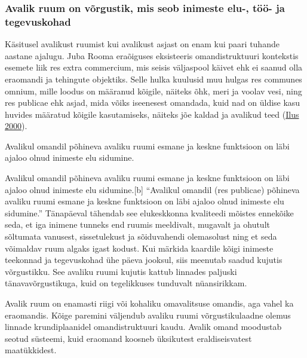 \documentclass[estonian,]{article}
\begin{document}
\hypertarget{avalik-ruum-on-vuxf5rgustik-mis-seob-inimeste-elu--tuxf6uxf6--ja-tegevuskohad}{%
\subsubsection*{Avalik ruum on võrgustik, mis seob inimeste elu-, töö- ja tegevuskohad}\label{avalik-ruum-on-vuxf5rgustik-mis-seob-inimeste-elu--tuxf6uxf6--ja-tegevuskohad}}

Käsitusel avalikust ruumist kui avalikust asjast on enam kui paari tuhande aastane ajalugu. Juba Rooma eraõiguses eksisteeris omandistruktuuri kontekstis esemete liik res extra commercium, mis seisis väljaspool käivet ehk ei saanud olla eraomandi ja tehingute objektiks. Selle hulka kuulusid muu hulgas res communes omnium, mille loodus on määranud kõigile, näiteks õhk, meri ja voolav vesi, ning res publicae ehk asjad, mida võiks iseenesest omandada, kuid nad on üldise kasu huvides määratud kõigile kasutamiseks, näiteks jõe kaldad ja avalikud teed (\protect\hyperlink{Ilus2000}{Ilus 2000}).

\begin{blockquote-right}
Avalikul omandil põhineva avaliku ruumi esmane ja keskne funktsioon on
läbi ajaloo olnud inimeste elu sidumine.
\end{blockquote-right}

Avalikul omandil põhineva avaliku ruumi esmane ja keskne funktsioon on läbi ajaloo olnud inimeste elu sidumine.{[}b{]}
``Avalikul omandil (res publicae) põhineva avaliku ruumi esmane ja keskne funktsioon on läbi ajaloo olnud inimeste elu sidumine.'' Tänapäeval tähendab see elukeskkonna kvaliteedi mõistes ennekõike seda, et iga inimene tunneks end ruumis meeldivalt, mugavalt ja ohutult sõltumata vanusest, sissetulekust ja sõiduvahendi olemasolust ning et seda võimaldav ruum algaks igast kodust. Kui märkida kaardile kõigi inimeste teekonnad ja tegevuskohad ühe päeva jooksul, siis meenutab saadud kujutis võrgustikku. See avaliku ruumi kujutis kattub linnades paljuski tänavavõrgustikuga, kuid on tegelikkuses tunduvalt nüansirikkam.

Avalik ruum on enamasti riigi või kohaliku omavalitsuse omandis, aga vahel ka eraomandis. Kõige paremini väljendub avaliku ruumi võrgustikulaadne olemus linnade krundiplaanidel omandistruktuuri kaudu. Avalik omand moodustab seotud süsteemi, kuid eraomand koosneb üksikutest eraldiseisvatest maatükkidest.
\end{document}
